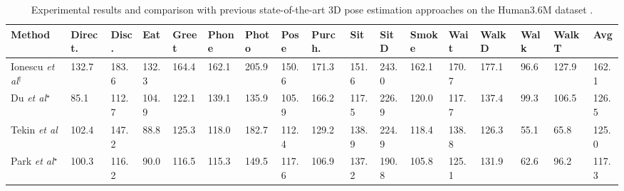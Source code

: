 \documentclass{bmvc2k}
\def\etal{\emph{et al}\bmvaOneDot}
\begin{document}
\begin{table}[ht]
\caption{\label{tab:1} Experimental results and comparison with previous state-of-the-art 3D pose estimation approaches on the Human3.6M dataset \cite{6682899}.}
\vspace*{-0.2cm}
\begin{center}
\begin{tabular}{p{1.5cm}p{0.25cm}p{0.25cm}p{0.25cm}p{0.25cm}p{0.25cm}p{0.25cm}p{0.25cm}p{0.25cm}p{0.25cm}p{0.25cm}p{0.25cm}p{0.25cm}p{0.25cm}p{0.25cm}p{0.25cm}p{0.25cm}}
\hline
\hline
{\tiny Method} &  {\tiny Direct.} & {\tiny Disc.} & {\tiny Eat} & {\tiny Greet} & {\tiny Phone} & {\tiny Photo} & {\tiny Pose} & {\tiny Purch.} & {\tiny Sit} & {\tiny SitD} & {\tiny Smoke} & {\tiny Wait} & {\tiny WalkD} & {\tiny Walk} & {\tiny WalkT} & {\tiny Avg} \\
\hline
 \cellcolor{gray!30} {\tiny Ionescu \etal \cite{6682899}$^{\dagger}$} & \cellcolor{gray!30} {\tiny 132.7} & \cellcolor{gray!30} {\tiny 183.6} & \cellcolor{gray!30} {\tiny 132.3} & \cellcolor{gray!30} {\tiny 164.4} & \cellcolor{gray!30} {\tiny 162.1} & \cellcolor{gray!30} {\tiny 205.9} & \cellcolor{gray!30} {\tiny 150.6} & \cellcolor{gray!30} {\tiny 171.3} & \cellcolor{gray!30} {\tiny 151.6} & \cellcolor{gray!30} {\tiny 243.0} & \cellcolor{gray!30} {\tiny 162.1} & \cellcolor{gray!30} {\tiny 170.7} & \cellcolor{gray!30} {\tiny 177.1} & \cellcolor{gray!30} {\tiny 96.6} & \cellcolor{gray!30} {\tiny 127.9} & \cellcolor{gray!30} {\tiny 162.1} \\
 {\tiny Du \etal \cite{10.1007/978-3-319-46493-0_2}$^{\star}$} & {\tiny 85.1} & {\tiny 112.7} & {\tiny 104.9} & {\tiny 122.1} & {\tiny 139.1} & {\tiny 135.9} & {\tiny 105.9} & {\tiny 166.2} & {\tiny 117.5} & {\tiny 226.9} & {\tiny 120.0} & {\tiny 117.7} & {\tiny 137.4} & {\tiny 99.3} & {\tiny 106.5} & {\tiny 126.5} \\
 \cellcolor{gray!30} {\tiny Tekin \etal \cite{tekin2016direct} } & \cellcolor{gray!30} {\tiny 102.4} & \cellcolor{gray!30} {\tiny 147.2} & \cellcolor{gray!30} {\tiny88.8} & \cellcolor{gray!30} {\tiny 125.3} & \cellcolor{gray!30} {\tiny 118.0} & \cellcolor{gray!30} {\tiny 182.7} & \cellcolor{gray!30} {\tiny112.4} & \cellcolor{gray!30} {\tiny129.2} & \cellcolor{gray!30} {\tiny138.9} & \cellcolor{gray!30} {\tiny 224.9} & \cellcolor{gray!30} {\tiny 118.4} & \cellcolor{gray!30} {\tiny138.8} & \cellcolor{gray!30} {\tiny 126.3} & \cellcolor{gray!30} {\tiny 55.1} & \cellcolor{gray!30} {\tiny 65.8} & \cellcolor{gray!30} {\tiny 125.0} \\
 {\tiny Park \etal \cite{10.1007/978-3-319-49409-8_15}$^{\star}$} & {\tiny 100.3} & {\tiny 116.2} & {\tiny 90.0} & {\tiny 116.5} & {\tiny 115.3} & {\tiny 149.5} & {\tiny 117.6} & {\tiny 106.9} & {\tiny 137.2} & {\tiny 190.8} & {\tiny 105.8} &{\tiny 125.1} & {\tiny 131.9} & {\tiny 62.6} & {\tiny 96.2} & {\tiny 117.3}\\

\end{tabular}
\end{center}
\end{table}
\end{document}
